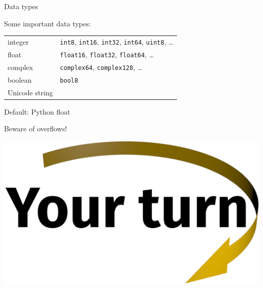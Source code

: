 \documentclass[svgnames]{beamer}
\begin{document}
\begin{frame}{Data types}

\vspace{0.2truecm}
Some important data types:

\vspace{0.2truecm}
\begin{tabular}{ll}
integer & \texttt{int8}, \texttt{int16}, \texttt{int32}, \texttt{int64}, \texttt{uint8}, \dots\\[0.2truecm]
float   & \texttt{float16}, \texttt{float32}, \texttt{float64}, \dots \\[0.2truecm]
complex & \texttt{complex64}, \texttt{complex128}, \dots\\[0.2truecm]
boolean & \texttt{bool8}\\[0.2truecm]
Unicode string  & \\
\end{tabular}

\vspace{0.2truecm}
Default: Python float

\vspace{0.3truecm}
\begin{center}
 \alert{\raisebox{0.4em}{\dbend}\quad Beware of overflows!}
\end{center}

\vspace{0.3truecm}
\begin{center}
 \includegraphics[width=3truecm]{yourturn}
\end{center}
\end{frame}
\end{document}
